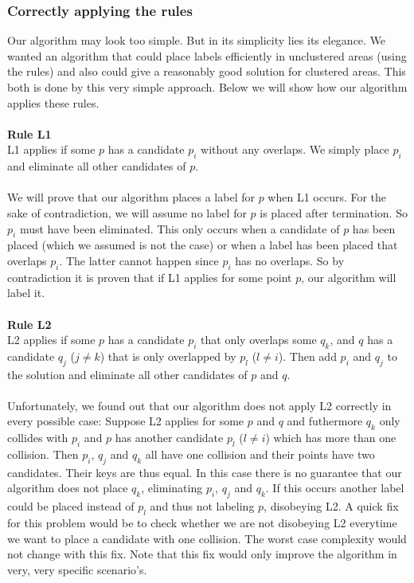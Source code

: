 \documentclass[crop=false,a4paper,oneside,11pt]{article}
\begin{document}
\subsubsection{Correctly applying the rules}
Our algorithm may look too simple. But in its simplicity lies its elegance. We wanted an algorithm that could place labels efficiently in unclustered areas (using the rules) and also could give a reasonably good solution for clustered areas. This both is done by this very simple approach. Below we will show how our algorithm applies these rules.\\
\\
\textbf{Rule L1}\\
L1 applies if some $p$ has a candidate $p_i$ without any overlaps. We simply place $p_i$ and eliminate all other candidates of $p$.\\
\\
We will prove that our algorithm places a label for $p$ when L1 occurs. For the sake of contradiction, we will assume no label for $p$ is placed after termination. So $p_i$ must have been eliminated. This only occurs when a candidate of $p$ has been placed (which we assumed is not the case) or when a label has been placed that overlaps $p_i$. The latter cannot happen since $p_i$ has no overlaps. So by contradiction it is proven that if L1 applies for some point $p$, our algorithm will label it.\\
\\
\textbf{Rule L2}\\
L2 applies if some $p$ has a candidate $p_i$ that only overlaps some $q_k$, and $q$ has a
candidate $q_j$ ($j \neq k$) that is only overlapped by $p_l$ ($l \neq i$). Then add $p_i$
and $q_j$ to the solution and eliminate all other candidates of $p$ and $q$.\\
\\
Unfortunately, we found out that our algorithm does not apply L2 correctly in every possible case: Suppose L2 applies for some $p$ and $q$ and futhermore $q_k$ only collides with $p_i$ and $p$ has another candidate $p_l$ ($l\neq i$) which has more than one collision. Then $p_i$, $q_j$ and $q_k$ all have one collision and their points have two candidates. Their keys are thus equal. In this case there is no guarantee that our algorithm does not place $q_k$, eliminating $p_i$, $q_j$ and $q_k$. If this occurs another label could be placed instead of $p_l$ and thus not labeling $p$, disobeying L2. A quick fix for this problem would be to check whether we are not disobeying L2 everytime we want to place a candidate with one collision. The worst case complexity would not change with this fix. Note that this fix would only improve the algorithm in very, very specific scenario's.\\
\end{document}
